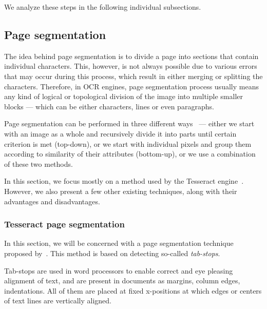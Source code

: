 We analyze these steps in the following individual subsections.

\subsection{Page segmentation}

The idea behind page segmentation is to divide a page into sections that contain individual characters. This, however, is not always possible due to various errors that may occur during this process, which result in either merging or splitting the characters. Therefore, in OCR engines, page segmentation process usually means any kind of logical or topological division of the image into multiple smaller blocks --- which can be either characters, lines or even paragraphs.

Page segmentation can be performed in three different ways~\citep{segmentationOverview} --- either we start with an image as a whole and recursively divide it into parts until certain criterion is met (top-down), or we start with individual pixels and group them according to similarity of their attributes (bottom-up), or we use a combination of these two methods.

In this section, we focus mostly on a method used by the Tesseract engine~\cite{tesseractSegmentationTab}. However, we also present a few other existing techniques, along with their advantages and disadvantages.

\subsubsection{Tesseract page segmentation} \label{sectionTessPageSegm}

In this section, we will be concerned with a page segmentation technique proposed by~\citet{tesseractSegmentationTab}. This method is based on detecting so-called \emph{tab-stops}.

Tab-stops are used in word processors to enable correct and eye pleasing alignment of text, and are present in documents as margins, column edges, indentations. All of them are placed at fixed x-positions at which edges or centers of text lines are vertically aligned.

